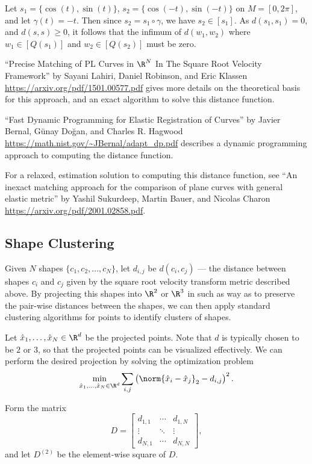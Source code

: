 \documentclass[12pt]{article}
\begin{document}
\begin{exmp}
    Let $s_1 = \{\cos(t), \sin(t)\}$, $s_2 = \{\cos(-t), \sin(-t)\}$ on $M = [0, 2\pi]$, and let $\gamma(t) =  -t$. Then since $s_2 = s_1 \circ \gamma$, we have $s_2 \in [s_1]$. As $d(s_1, s_1) = 0$, and $d(s, s) \geq 0$, it follows that the infimum of $d(w_1, w_2)$ where $w_1 \in [Q(s_1)]$ and $w_2 \in [Q(s_2)]$ must be zero.
\end{exmp}

``Precise Matching of PL Curves in $\R^N$ In The Square Root Velocity Framework'' by Sayani Lahiri, Daniel Robinson, and Eric Klassen \url{https://arxiv.org/pdf/1501.00577.pdf} gives more details on the theoretical basis for this approach, and an exact algorithm to solve this distance function.

``Fast Dynamic Programming for Elastic Registration of Curves'' by Javier Bernal, G\"unay Do\u{g}an, and Charles R. Hagwood \url{https://math.nist.gov/~JBernal/adapt_dp.pdf} describes a dynamic programming approach to computing the distance function.

For a relaxed, estimation solution to computing this distance function, see ``An inexact matching approach for the comparison of plane curves with general elastic metric'' by Yashil Sukurdeep, Martin Bauer, and Nicolas Charon \url{https://arxiv.org/pdf/2001.02858.pdf}.

\subsection{Shape Clustering}

Given $N$ shapes $\{c_1, c_2, \ldots, c_N\}$, let $d_{i,j}$ be $d(c_i, c_j)$ --- the distance between shapes $c_i$ and $c_j$ given by the square root velocity transform metric described above. By projecting this shapes into $\R^2$ or $\R^3$ in such as way as to preserve the pair-wise distances between the shapes, we can then apply standard clustering algorithms for points to identify clusters of shapes.

Let $\hat{x}_1, \ldots, \hat{x}_N \in \R^d$ be the projected points. Note that $d$ is typically chosen to be $2$ or $3$, so that the projected points can be visualized effectively. We can perform the desired projection by solving the optimization problem
\[\min_{\hat{x}_1, \ldots, \hat{x}_N \in \R^d}\sum_{i, j}\left(\norm{\hat{x}_i - \hat{x}_j}_2 - d_{i, j}\right)^2.\]

Form the matrix
\[D = \begin{bmatrix}
    d_{1, 1} & \cdots & d_{1, N} \\
    \vdots & \ddots & \vdots \\
    d_{N, 1} & \cdots & d_{N, N}
\end{bmatrix},\] and let $D^{(2)}$ be the element-wise square of $D$.
\end{document}
